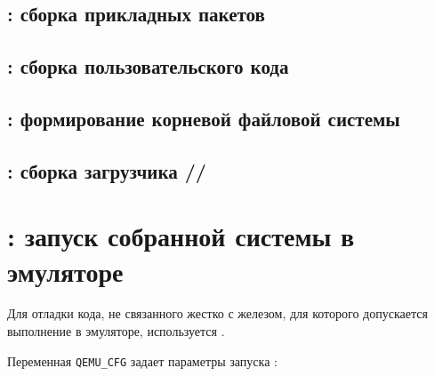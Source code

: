 \subsection{: сборка прикладных пакетов }
\label{azapps}

\subsection{: сборка пользовательского кода} \label{azuser}

\subsection{: формирование корневой файловой системы} \label{azroot}
\subsection{: сборка загрузчика
//
} \label{azboot}

\subsubsection{}

\subsubsection{}

\subsubsection{}

\section{: запуск собранной системы в эмуляторе} \label{azemu}

Для отладки кода, не связанного жестко с железом, для которого
допускается выполнение в эмуляторе, используется .



Переменная \verb|QEMU_CFG| задает параметры запуска :

